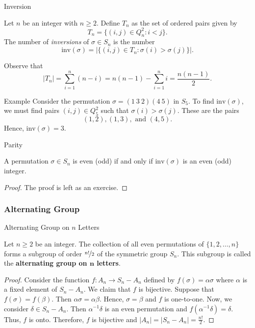 \documentclass{beamer}
\begin{document}
\begin{frame}{Inversion}
	\justifying
	\begin{definition}
	\justifying
	Let $n$ be an integer with $n \geq 2$. Define $T_n$ as the set of ordered pairs given by
	\[
	T_n = \{(i, j) \in Q_n^2 : i < j\}.
	\]
	The number of \textit{inversions} of $\sigma \in S_n$ is the number
	\[
	\text{inv}(\sigma) = \left|\{(i, j) \in T_n : \sigma(i) > \sigma(j)\}\right|.
	\]
	\end{definition}
	Observe that 
	\[
	|T_n| = \sum_{i = 1}^n(n - i) = n(n - 1) - \sum_{i = 1}^ni = \dfrac{n(n-1)}{2}.
	\]
\end{frame}

\begin{frame}{Example}
\justifying
Consider the permutation $\sigma = (1 \ 3 \ 2)(4 \ 5)$ in $S_5$. To find $\text{inv}(\sigma)$, we must find pairs $(i, j) \in Q_5^2$ such that $\sigma(i) > \sigma(j)$. These are the pairs 
\[
(1, 2), (1, 3), \text{ and } (4, 5).
\]
Hence, $\text{inv}(\sigma) = 3$.
\end{frame}

\begin{frame}{Parity}
\begin{theorem}
\justifying
A permutation $\sigma \in S_n$ is even (odd) if and only if $\text{inv}(\sigma)$ is an even (odd) integer.
\end{theorem}
\begin{proof}
The proof is left as an exercise.
\end{proof}
\end{frame}

\subsubsection{Alternating Group}

\begin{frame}{Alternating Group on $n$ Letters}
\begin{theorem}
\justifying
Let $n \geq 2$ be an integer. The collection of all even permutations of $\{1, 2, \dots, n\}$ forms a subgroup of order $\nicefrac{n!}{2}$ of the symmetric group $S_n$. This subgroup is called the \textbf{alternating group on $\boldsymbol{n}$ letters}.      
\end{theorem}
\pause
\begin{proof}
\justifying
Consider the function $f: A_n \rightarrow S_n - A_n$ defined by $f(\sigma) = \alpha\sigma$ where $\alpha$ is a fixed element of $S_n - A_n$. We claim that $f$ is bijective. Suppose that $f(\sigma) = f(\beta)$. Then $\alpha\sigma = \alpha\beta$. Hence, $\sigma = \beta$ and $f$ is one-to-one. Now, we consider $\delta \in S_n - A_n$. Then $\alpha^{-1}\delta$ is an even permutation and $f(\alpha^{-1}\delta) = \delta$. Thus, $f$ is onto. Therefore, $f$ is bijective and $|A_n| = |S_n - A_n| = \frac{n!}{2}$.
\end{proof} 
\end{frame}
\end{document}
